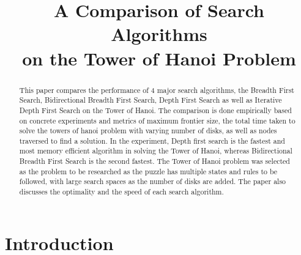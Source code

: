 \documentclass[conference]{IEEEtran}
\begin{document}
\title{A Comparison of Search Algorithms\\ on the Tower of Hanoi Problem  }

\author{
}
\maketitle

\begin{abstract}
This paper compares the performance of 4 major search algorithms, the Breadth First Search, Bidirectional Breadth First Search, Depth First Search as well as Iterative Depth First Search on the Tower of Hanoi. The comparison is done empirically based on concrete experiments and metrics of maximum frontier size, the total time taken to solve the towers of hanoi problem with varying number of disks, as well as nodes traversed to find a solution. In the experiment, Depth first search is the fastest and most memory efficient algorithm in solving the Tower of Hanoi, whereas Bidirectional Breadth First Search is the second fastest. The Tower of Hanoi problem was selected as the problem to be researched as the puzzle has multiple states and rules to be followed, with large search spaces as the number of disks are added. The paper also discusses the optimality and the speed of each search algorithm.

\end{abstract}

\section{Introduction}
\end{document}

